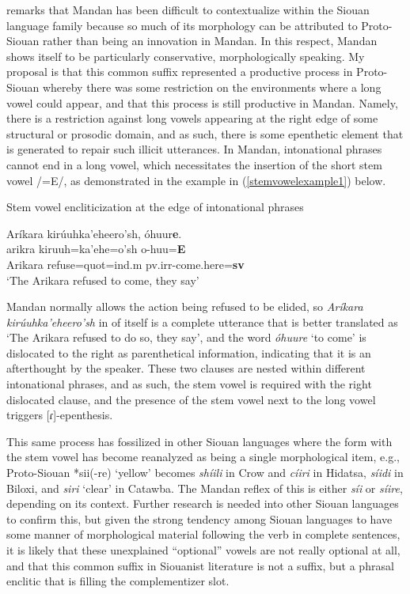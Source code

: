 \citet{rankin2010} remarks that Mandan has been difficult to contextualize within the Siouan language family because so much of its morphology can be attributed to Proto-Siouan rather than being an innovation in Mandan. In this respect, Mandan shows itself to be particularly conservative, morphologically speaking. My proposal is that this common suffix represented a productive process in Proto-Siouan whereby there was some restriction on the environments where a long vowel could appear, and that this process is still productive in Mandan. Namely, there is a restriction against long vowels appearing at the right edge of some structural or prosodic domain, and as such, there is some epenthetic element that is generated to repair such illicit utterances. In Mandan, intonational phrases cannot end in a long vowel, which necessitates the insertion of the short stem vowel /{=E}/, as demonstrated in the example in (\ref{stemvowelexample1}) below.

\begin{exe}
\item\label{stemvowelexample1} Stem vowel encliticization at the edge of intonational phrases

\glll	Aríkara kirúuhka'eheero'sh, óhuur\textbf{e}.\\
	arikra kiruuh=ka'ehe=o'sh o-huu=\textbf{E}\\
	\textnormal{Arikara} \textnormal{refuse}=quot=ind.m pv.irr-\textnormal{come.here}=\textbf{sv}\\
\glt	`The Arikara refused to come, they say' \citep[48]{hollow1973a}
\end{exe}

Mandan normally allows the action being refused to be elided, so \textit{Aríkara kirúuhka'eheero'sh} in of itself is a complete utterance that is better translated as `The Arikara refused to do so, they say', and the word \textit{óhuure} `to come' is dislocated to the right as parenthetical information, indicating that it is an afterthought by the speaker. These two clauses are nested within different intonational phrases, and as such, the stem vowel is required with the right dislocated clause, and the presence of the stem vowel next to the long vowel triggers [ɾ]-epenthesis.

This same process has fossilized in other Siouan languages where the form with the stem vowel has become reanalyzed as being a single morphological item, e.g., Proto-Siouan *sii(-re) `yellow' becomes \textit{shíili} in Crow and \textit{cíiri} in Hidatsa, \textit{síidi} in Biloxi, and \textit{siri} `clear' in Catawba. The Mandan reflex of this is either \textit{síi} or \textit{síire}, depending on its context. Further research is needed into other Siouan languages to confirm this, but given the strong tendency among Siouan languages to have some manner of morphological material following the verb in complete sentences, it is likely that these unexplained ``optional'' vowels are not really optional at all, and that this common suffix in Siouanist literature is not a suffix, but a phrasal enclitic that is filling the complementizer slot.

